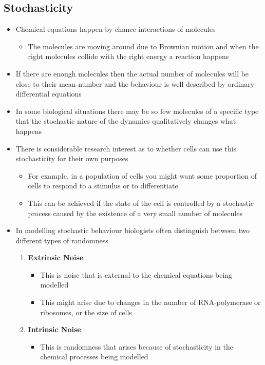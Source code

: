 \documentclass[11pt]{article}
\begin{document}
\subsection{Stochasticity}
\label{sec:orga0d267a}
\begin{itemize}
\item Chemical equations happen by chance interactions of molecules
\begin{itemize}
\item The molecules are moving around due to Brownian motion and when
the right molecules collide with the right energy a reaction happens
\end{itemize}
\item If there are enough molecules then the actual number of molecules
will be close to their mean number and the behaviour is well
described by ordinary differential equations
\item In some biological situations there may be so few molecules of a
specific type that the stochastic nature of the dynamics qualitatively
changes what happens
\item There is considerable research interest as to whether cells can
use this stochasticity for their own purposes
\begin{itemize}
\item For example, in a population of cells you might want some
proportion of cells to respond to a stimulus or to
differentiate
\item This can be achieved if the state of the cell is controlled by
a stochastic process caused by the existence of a very small
number of molecules
\end{itemize}
\item In modelling stochastic behaviour biologists often distinguish
between two different types of randomness
\begin{enumerate}
\item \textbf{Extrinsic Noise}
\begin{itemize}
\item This is noise that is external to the chemical equations
being modelled
\item This might arise due to changes in the number of RNA-polymerase
or ribosomes, or the size of cells
\end{itemize}
\item \textbf{Intrinsic Noise}
\begin{itemize}
\item This is randomness that arises because of stochasticity in
the chemical processes being modelled
\end{itemize}
\end{enumerate}
\end{itemize}
\end{document}
